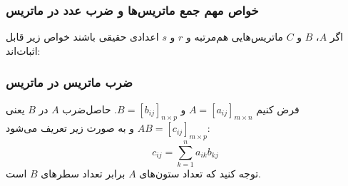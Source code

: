 \subsubsection*{خواص مهم جمع ماتریس‌ها و ضرب عدد در ماتریس}
اگر $A$، $B$ و $C$ ماتریس‌هایی هم‌مرتبه و $r$ و $s$ اعدادی حقیقی باشند خواص زیر قابل اثبات‌اند:
\vspace*{-1cm}

\subsubsection*{ضرب ماتریس در ماتریس}
فرض کنیم
$A=[a_{ij}]_{m \times n}$
و
$B=[b_{ij}]_{n \times p}$.
حاصل‌ضرب $A$ در $B$ یعنی
$AB=[c_{ij}]_{m \times p}$
و به صورت زیر تعریف می‌شود:
$$c_{ij} = \sum_{k=1}^{n}a_{ik}b_{kj}$$
توجه کنید که تعداد ستون‌های $A$ برابر تعداد سطرهای $B$ است.

